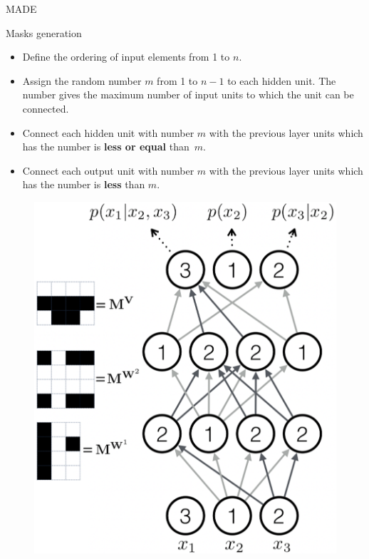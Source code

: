 \begin{frame}{MADE}
		\begin{minipage}[t]{0.65\columnwidth}
		    \vspace{-0.5cm}
			\begin{block}{Masks generation}
				\begin{itemize}
					\item Define the ordering of input elements from 1 to $n$.
					\item Assign the random number $m$ from 1 to $n - 1$ to each hidden unit. The number gives the
					maximum number of input units to which the unit can be connected.
					\item Connect each hidden unit with number $m$ with the previous layer units which has the number is \textbf{less or equal} than~$m$.
					\item Connect each output unit with number $m$ with the previous layer units which has the number is \textbf{less} than $m$.
				\end{itemize}
			\end{block}
		\end{minipage}%
		\begin{minipage}[t]{0.33\columnwidth}
			\vspace{2cm}
			\begin{figure}
				\centering
				\includegraphics[width=1.0\linewidth]{figs/made2}
			\end{figure}
		\end{minipage}
\end{frame}

